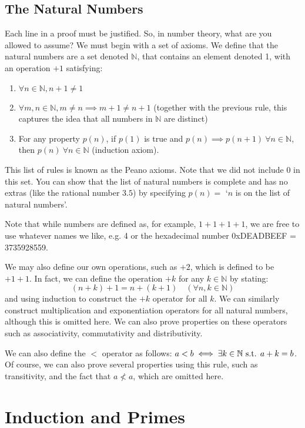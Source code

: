 \documentclass{article}
\begin{document}
\subsection{The Natural Numbers}
Each line in a proof must be justified. So, in number theory, what are you allowed to assume? We must begin with a set of axioms. We define that the natural numbers are a set denoted $\mathbb N$, that contains an element denoted 1, with an operation $+1$ satisfying:
\begin{enumerate}
	\item $\forall n \in \mathbb N, n + 1 \neq 1$
	\item $\forall m,n \in \mathbb N, m \neq n \implies m+1 \neq n+1$ (together with the previous rule, this captures the idea that all numbers in $\mathbb N$ are distinct)
	\item For any property $p(n)$, if $p(1)$ is true and $p(n) \implies p(n+1) \ \forall n \in \mathbb N$, then $p(n) \ \forall n \in \mathbb N$ (induction axiom).
\end{enumerate}

\noindent This list of rules is known as the Peano axioms. Note that we did not include 0 in this set. You can show that the list of natural numbers is complete and has no extras (like the rational number $3.5$) by specifying $p(n)=$ `$n$ is on the list of natural numbers'.

Note that while numbers are defined as, for example, $1+1+1+1$, we are free to use whatever names we like, e.g. 4 or the hexadecimal number 0xDEADBEEF = 3735928559.

We may also define our own operations, such as $+2$, which is defined to be $+1+1$. In fact, we can define the operation $+k$ for any $k \in \mathbb N$ by stating:
\[ (n+k)+1 = n+(k+1) \quad(\forall n, k \in \mathbb N) \]
\noindent and using induction to construct the $+k$ operator for all $k$. We can similarly construct multiplication and exponentiation operators for all natural numbers, although this is omitted here. We can also prove properties on these operators such as associativity, commutativity and distributivity.

We can also define the $<$ operator as follows: $a < b \iff \exists k \in \mathbb N \text{ s.t. } a + k = b$. Of course, we can also prove several properties using this rule, such as transitivity, and the fact that $a \nless a$, which are omitted here.

\section{Induction and Primes}
\end{document}
